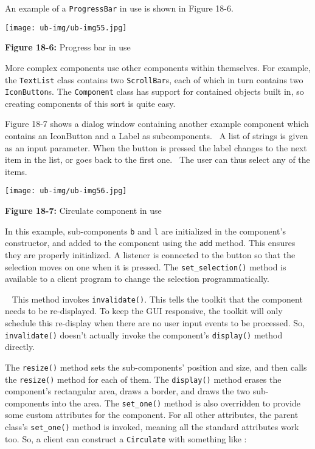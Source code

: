 An example of a \texttt{ProgressBar} in use is shown in Figure 18-6.

\begin{center}
\texttt{[image: ub-img/ub-img55.jpg]}
\end{center}

{\sffamily\bfseries Figure 18-6:}
{\sffamily Progress bar in use}

More complex components use other components within themselves. For
example, the \texttt{TextList} class contains two \texttt{ScrollBar}s,
each of which in turn contains two \texttt{IconButton}s. The
\texttt{Component} class has support for contained objects built in, so
creating components of this sort is quite easy.

Figure 18-7 shows a dialog window containing another example component
which contains an IconButton and a Label as subcomponents. \ A list of
strings is given as an input parameter. When the button is pressed the
label changes to the next item in the list, or goes back to the first
one. \ The user can thus select any of the items.

\begin{center}
\texttt{[image: ub-img/ub-img56.jpg]}
\end{center}

{\sffamily\bfseries Figure 18-7:}
{\sffamily Circulate component in use}

\bigskip

In this example, sub-components \texttt{b} and \texttt{l} are
initialized in the component's constructor, and
added to the component using the \texttt{add} method. This ensures
they are properly initialized. A listener is connected to the button
so that the selection moves on one when it is pressed. The
\texttt{set\_selection()} method is available to a client program to
change the selection programmatically.

\medskip{}\ {\sffamily
This method invokes
\texttt{invalidate()}. This tells the toolkit that the component
needs to be re-displayed. To keep the GUI responsive, the toolkit
will only schedule this re-display when there are no user input events
to be processed. So, \texttt{invalidate()} doesn't
actually invoke the component's \texttt{display()}
method directly.}\medskip

The \texttt{resize()} method sets the sub-components'
position and size, and then calls the \texttt{resize()} method for each
of them. The \texttt{display()} method erases the
component's rectangular area, draws a border, and
draws the two sub-components into the area. The \texttt{set\_one()}
method is also overridden to provide some custom attributes for the
component. For all other attributes, the parent
class's \texttt{set\_one()} method is invoked, meaning
all the standard attributes work too. So, a client can construct a
\texttt{Circulate} with something like :

